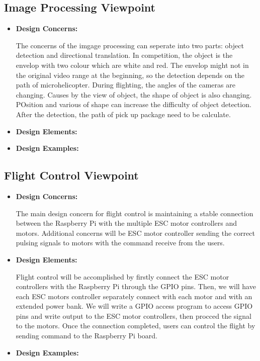 \documentclass[onecolumn, draftclsnofoot,10pt, compsoc]{IEEEtran}
\begin{document}
\subsection{Image Processing Viewpoint}
\begin{itemize}
\item{ \textbf{Design Concerns:}}

The concerns of the imgage processing can seperate into two parts: object detection and directional translation. In competition, the object is the envelop with two colour which are white and red. The envelop might not in the original video range at the beginning, so the detection depends on the path of microhelicopter. During flighting, the angles of the cameras are changing. Causes by the view of object, the shape of object is also changing. POsition and various of shape can increase the difficulty of object detection. After the detection, the path of pick up package need to be calculate. 
\item{ \textbf{Design Elements:}}

\item{ \textbf{Design Examples:}} %

\end{itemize}



\subsection{Flight Control Viewpoint} %
\begin{itemize}
\item{ \textbf{Design Concerns:}}

The main design concern for flight control is maintaining a stable connection between the Raspberry Pi with the multiple ESC motor controllers and motors. Additional concerns will be ESC motor controller sending the correct pulsing signals to motors with the command receive from the users. \\

\item{ \textbf{Design Elements:}}

Flight control will be accomplished by firstly connect the ESC motor controllers with the Raspberry Pi through the GPIO pins. Then, we will have each ESC motors controller separately connect with each motor and with an extended power bank. We will write a GPIO access program to access GPIO pins and write output to the ESC motor controllers, then procced the signal to the motors. Once the connection completed, users can control the flight by sending command to the Raspberry Pi board.\\
\item{ \textbf{Design Examples:}} %

\end{itemize}
\end{document}
